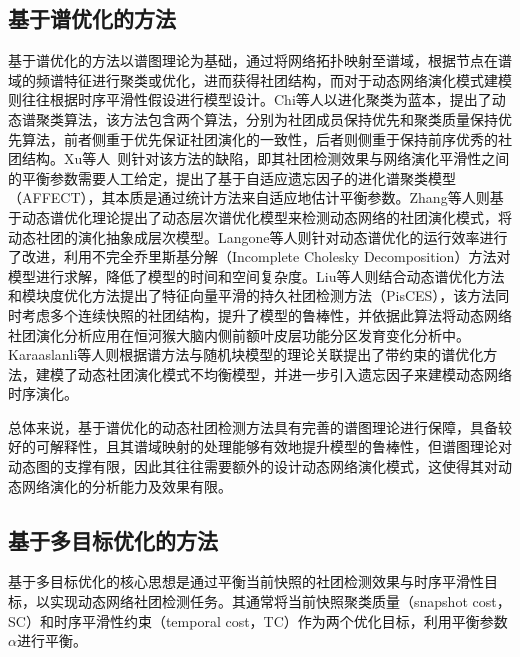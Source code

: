 \subsection{基于谱优化的方法}
基于谱优化的方法以谱图理论为基础，通过将网络拓扑映射至谱域，根据节点在谱域的频谱特征进行聚类或优化，进而获得社团结构，而对于动态网络演化模式建模则往往根据时序平滑性假设进行模型设计。Chi等人\cite{chi2007evolutionary}以进化聚类为蓝本，提出了动态谱聚类算法，该方法包含两个算法，分别为社团成员保持优先和聚类质量保持优先算法，前者侧重于优先保证社团演化的一致性，后者则侧重于保持前序优秀的社团结构。Xu等人~\cite{xu2014adaptive}则针对该方法的缺陷，即其社团检测效果与网络演化平滑性之间的平衡参数需要人工给定，提出了基于自适应遗忘因子的进化谱聚类模型（AFFECT），其本质是通过统计方法来自适应地估计平衡参数。Zhang等人\cite{zhang2016dynamic}则基于动态谱优化理论提出了动态层次谱优化模型来检测动态网络的社团演化模式，将动态社团的演化抽象成层次模型。Langone等人\cite{langone2016efficient}则针对动态谱优化的运行效率进行了改进，利用不完全乔里斯基分解（Incomplete Cholesky Decomposition）方法对模型进行求解，降低了模型的时间和空间复杂度。Liu等人\cite{liu2018global}则结合动态谱优化方法和模块度优化方法提出了特征向量平滑的持久社团检测方法（PisCES），该方法同时考虑多个连续快照的社团结构，提升了模型的鲁棒性，并依据此算法将动态网络社团演化分析应用在恒河猴大脑内侧前额叶皮层功能分区发育变化分析中。Karaaslanli等人\cite{karaaslanli2020constrained}则根据谱方法与随机块模型的理论关联提出了带约束的谱优化方法，建模了动态社团演化模式不均衡模型，并进一步引入遗忘因子来建模动态网络时序演化\cite{karaaslanli2021community}。

总体来说，基于谱优化的动态社团检测方法具有完善的谱图理论进行保障，具备较好的可解释性，且其谱域映射的处理能够有效地提升模型的鲁棒性，但谱图理论对动态图的支撑有限，因此其往往需要额外的设计动态网络演化模式，这使得其对动态网络演化的分析能力及效果有限。

\subsection{基于多目标优化的方法}

基于多目标优化的核心思想是通过平衡当前快照的社团检测效果与时序平滑性目标，以实现动态网络社团检测任务。其通常将当前快照聚类质量（snapshot cost，SC）和时序平滑性约束（temporal cost，TC）作为两个优化目标，利用平衡参数$\alpha$进行平衡。

